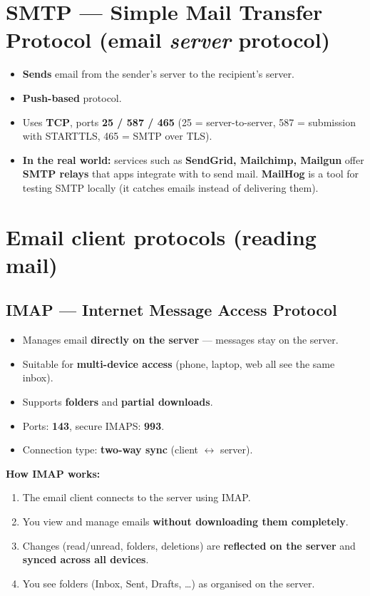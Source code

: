 \section{SMTP --- Simple Mail Transfer Protocol (email \emph{server} protocol)}
\begin{itemize}
  \item \textbf{Sends} email from the sender's server to the recipient's server.
  \item \textbf{Push-based} protocol.
  \item Uses \textbf{TCP}, ports \textbf{25 / 587 / 465} (25 = server-to-server, 587 = submission with STARTTLS, 465 = SMTP over TLS).
  \item \textbf{In the real world:} services such as \textbf{SendGrid, Mailchimp, Mailgun} offer \textbf{SMTP relays} that apps integrate with to send mail. \textbf{MailHog} is a tool for testing SMTP locally (it catches emails instead of delivering them).
\end{itemize}

\section{Email client protocols (reading mail)}

\subsection{IMAP --- Internet Message Access Protocol}
\begin{itemize}
  \item Manages email \textbf{directly on the server} --- messages stay on the server.
  \item Suitable for \textbf{multi-device access} (phone, laptop, web all see the same inbox).
  \item Supports \textbf{folders} and \textbf{partial downloads}.
  \item Ports: \textbf{143}, secure IMAPS: \textbf{993}.
  \item Connection type: \textbf{two-way sync} (client $\leftrightarrow$ server).
\end{itemize}
\textbf{How IMAP works:}
\begin{enumerate}
  \item The email client connects to the server using IMAP.
  \item You view and manage emails \textbf{without downloading them completely}.
  \item Changes (read/unread, folders, deletions) are \textbf{reflected on the server} and \textbf{synced across all devices}.
  \item You see folders (Inbox, Sent, Drafts, \ldots) as organised on the server.
\end{enumerate}

